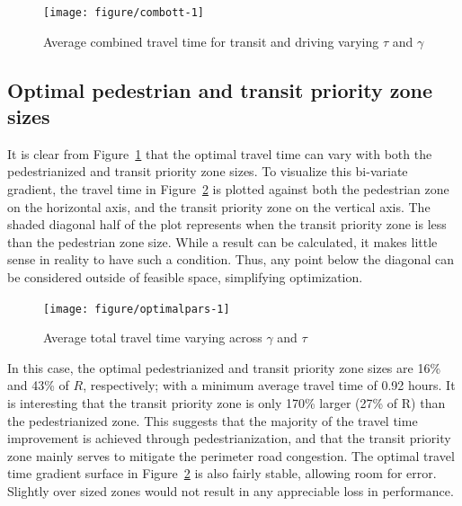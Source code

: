 \documentclass{elsarticle}\usepackage[]{graphicx}\usepackage[]{color}
\newenvironment{knitrout}{}{} %
\begin{document}
\begin{figure}[H]
\centering
\begin{knitrout}
\color{fgcolor}
\texttt{[image: figure/combott-1]} 
\end{knitrout}
    \caption{Average combined travel time for transit and driving varying $\tau$ and $\gamma$}
    \label{fig:combott}
\end{figure}

\subsection{Optimal pedestrian and transit priority zone sizes}
It is clear from Figure~\ref{fig:combott} that the optimal travel time can vary with both the pedestrianized and transit priority zone sizes. To visualize this bi-variate gradient, the travel time in Figure~\ref{fig:optimal} is plotted against both the pedestrian zone on the horizontal axis, and the transit priority zone on the vertical axis. The shaded diagonal half of the plot represents when the transit priority zone is less than the pedestrian zone size. While a result can be calculated, it makes little sense in reality to have such a condition. Thus, any point below the diagonal can be considered outside of feasible space, simplifying optimization.

\begin{figure}[H]
    \centering
\begin{knitrout}
\color{fgcolor}
\texttt{[image: figure/optimalpars-1]} 
\end{knitrout}
    \caption{Average total travel time varying across $\gamma$ and $\tau$}
    \label{fig:optimal}
\end{figure}

In this case, the optimal pedestrianized and transit priority zone sizes are 16\% and 43\% of $R$, respectively; with a minimum average travel time of 0.92 hours. It is interesting that the transit priority zone is only 170\% larger (27\% of R) than the pedestrianized zone. This suggests that the majority of the travel time improvement is achieved through pedestrianization, and that the transit priority zone mainly serves to mitigate the perimeter road congestion. The optimal travel time gradient surface in Figure~\ref{fig:optimal} is also fairly stable, allowing room for error. Slightly over sized zones would not result in any appreciable loss in performance.
\end{document}
